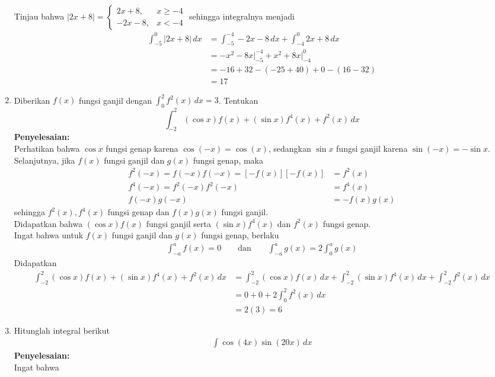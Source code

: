 \documentclass{article}
\begin{document}
\begin{enumerate}
Tinjau bahwa $|2x+8| = \begin{cases}2x+8, &x\geq -4\\
-2x-8, &x<-4\end{cases}$ sehingga integralnya menjadi 
\begin{align*}
\int_{-5}^0 |2x+8|\, dx &= \int_{-5}^{-4} -2x-8\, dx +\int_{-4}^0 2x+8\, dx\\
&= -x^2-8x\bigg|_{-5}^{-4} + x^2+8x\bigg|_{-4}^{0}\\
&= -16+32-(-25+40) + 0 - (16-32)\\
&= 17
\end{align*}
\item Diberikan $f(x)$ fungsi ganjil dengan $\displaystyle \int_0^2 f^2(x) \, dx=3$. Tentukan $$\displaystyle \int_{-2}^2 (\cos x) f(x) + (\sin x) f^4(x) + f^2(x) \, dx $$
\textbf{Penyelesaian:}\\
Perhatikan bahwa $\cos x$ fungsi genap karena $\cos (-x)=\cos (x)$, sedangkan $\sin x$ fungsi ganjil karena $\sin (-x) = -\sin x$. Selanjutnya, jika $f(x)$ fungsi ganjil dan $g(x)$ fungsi genap, maka 
\begin{align*}
f^2(-x) = f(-x)f(-x) = [-f(x)][-f(x)] &= f^2(x)\\
f^4(-x) = f^2(-x)f^2(-x) &= f^4(x)\\
f(-x)g(-x) &= -f(x)g(x)
\end{align*}
sehingga $f^2(x), f^4(x)$ fungsi genap dan $f(x)g(x)$ fungsi ganjil.\\
Didapatkan bahwa $(\cos x)f(x)$ fungsi ganjil serta $(\sin x)f^4(x)$ dan $f^2(x)$ fungsi genap.\\
Ingat bahwa untuk $f(x)$ fungsi ganjil dan $g(x)$ fungsi genap, berlaku
\begin{align*}
\int_{-a}^a f(x) = 0 \qquad \text{dan} \qquad
\int_{-a}^a g(x) = 2\int_0^a g(x)
\end{align*}
Didapatkan 
\begin{align*}
\int_{-2}^2 (\cos x) f(x) + (\sin x) f^4(x) + f^2(x) \, dx &= \int_{-2}^2 (\cos x) f(x) \, dx+ \int_{-2}^2 (\sin x) f^4(x) \, dx + \int_{-2}^2 f^2(x) \, dx\\
&= 0 + 0 + 2\int_0^2 f^2(x)\, dx\\
&= 2(3) = 6
\end{align*}
\item Hitunglah integral berikut 
\begin{align*}
\int \cos (4x)\sin (20x)\, dx
\end{align*}
\textbf{Penyelesaian:}\\
Ingat bahwa 

\end{enumerate}
\end{document}
